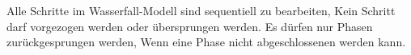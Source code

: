 Alle Schritte im Wasserfall-Modell sind sequentiell zu bearbeiten, \dahe Kein Schritt darf vorgezogen werden oder übersprungen werden. Es dürfen nur Phasen zurückgesprungen werden, Wenn eine Phase nicht abgeschlossenen werden kann.





